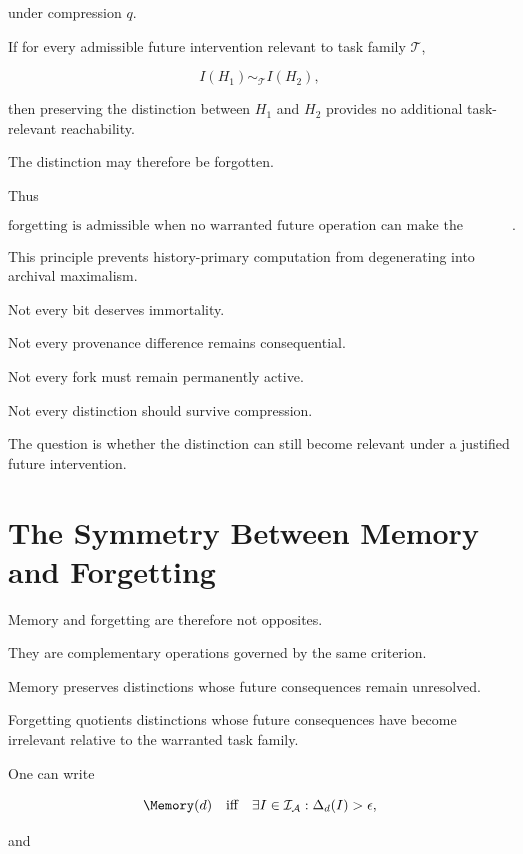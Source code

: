 \documentclass[11pt]{article}
\theoremstyle{remark}
\newcommand{\Adm}{\mathcal{A}}
\begin{document}
under compression $q$.

If for every admissible future intervention relevant to task family $\mathcal{T}$,

\begin{equation}
I(H_1)
\sim_{\mathcal{T}}
I(H_2),
\end{equation}

then preserving the distinction between $H_1$ and $H_2$ provides no additional task-relevant reachability.

The distinction may therefore be forgotten.

Thus

\begin{equation}
\boxed{
\text{forgetting is admissible when no warranted future operation can make the forgotten distinction matter}.
}
\end{equation}

This principle prevents history-primary computation from degenerating into archival maximalism.

Not every bit deserves immortality.

Not every provenance difference remains consequential.

Not every fork must remain permanently active.

Not every distinction should survive compression.

The question is whether the distinction can still become relevant under a justified future intervention.

\section{The Symmetry Between Memory and Forgetting}

Memory and forgetting are therefore not opposites.

They are complementary operations governed by the same criterion.

Memory preserves distinctions whose future consequences remain unresolved.

Forgetting quotients distinctions whose future consequences have become irrelevant relative to the warranted task family.

One can write

\begin{equation}
\Memory(d)
\quad\text{iff}\quad
\exists I\in\mathcal{I}_{\Adm}
:
\Delta_d(I)>\epsilon,
\end{equation}

and
\end{document}
